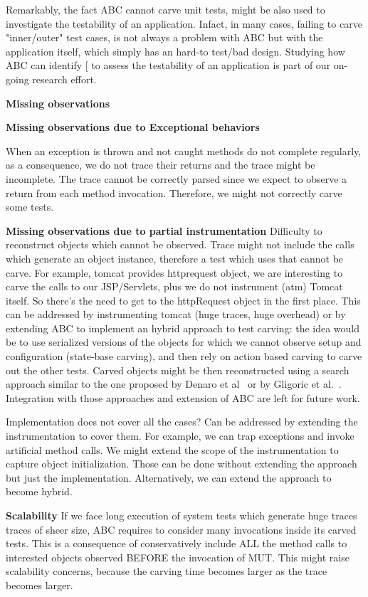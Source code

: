 \documentclass[10pt,conference]{IEEEtran}
\makeatletter
\gdef\xxx{\@ifnextchar[\xxx@lab\xxx@nolab}
\newcommand{\abc}{\textsf{ABC}\xspace}
\makeatother
\begin{document}
Remarkably, the fact \abc cannot carve unit tests, might be also used to investigate the testability of an application. Infact, in many cases, failing to carve "inner/outer" test cases, is not always a problem with \abc but with the application itself, which simply has an hard-to test/bad design. Studying how \abc can identify \xxx{code smells} to assess the testability of an application is part of our on-going research effort.

\textbf{Missing observations}

\textbf{Missing observations due to Exceptional behaviors}

When an exception is thrown and not caught methods do not complete regularly, as a consequence, we do not trace their returns and the trace might be incomplete. The trace cannot be correctly parsed since we expect to observe a return from each method invocation.  Therefore, we might not correctly carve some tests.

\textbf{Missing observations due to partial instrumentation}
Difficulty to reconstruct objects which cannot be observed. Trace might not include the calls which generate an object instance, therefore a test which uses that cannot be carve. For example, tomcat provides httprequest object, we are interesting to carve the calls to our JSP/Servlets, plus we do not instrument (atm) Tomcat itself. So there's the need to get to the httpRequest object in the first place. This can be addressed by instrumenting tomcat (huge traces, huge overhead) or by extending \abc to implement an hybrid approach to test carving: the idea would be to use serialized versions of the objects for which we cannot observe setup and configuration (state-base carving), and then rely on action based carving to carve out the other tests. Carved objects might be then reconstructed using a search approach similar to the one proposed by Denaro et al~\cite{} or by Gligoric et al.~\cite{}. Integration with those approaches and extension of \abc are left for future work.

Implementation does not cover all the cases? Can be addressed by extending the instrumentation to cover them.
For example, we can trap exceptions and invoke artificial method calls. We might extend the scope of the instrumentation to capture object initialization. Those can be done without extending the approach but just the implementation. Alternatively, we can extend the approach to become hybrid.

\textbf{Scalability}
If we face long execution of system tests which generate huge traces traces of sheer size, \abc requires to consider many invocations inside its carved  tests. This is a consequence of conservatively include ALL the method calls to interested objects observed BEFORE the invocation of MUT.
This might raise scalability concerns, because the carving time becomes larger as the trace becomes larger.
\end{document}
